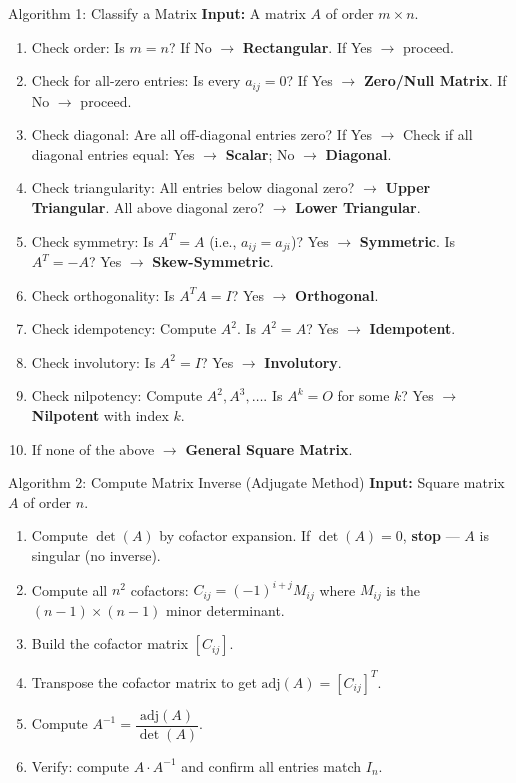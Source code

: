 \documentclass[12pt,a4paper]{article}
\begin{document}
\begin{learnbox}{Algorithm 1: Classify a Matrix}
\textbf{Input:} A matrix $A$ of order $m \times n$.
\begin{enumerate}
  \item Check order: Is $m = n$? If No $\to$ \textbf{Rectangular}. If Yes $\to$ proceed.
  \item Check for all-zero entries: Is every $a_{ij} = 0$? If Yes $\to$ \textbf{Zero/Null Matrix}. If No $\to$ proceed.
  \item Check diagonal: Are all off-diagonal entries zero? If Yes $\to$ Check if all diagonal entries equal: Yes $\to$ \textbf{Scalar}; No $\to$ \textbf{Diagonal}.
  \item Check triangularity: All entries below diagonal zero? $\to$ \textbf{Upper Triangular}. All above diagonal zero? $\to$ \textbf{Lower Triangular}.
  \item Check symmetry: Is $A^T = A$ (i.e., $a_{ij} = a_{ji}$)? Yes $\to$ \textbf{Symmetric}. Is $A^T = -A$? Yes $\to$ \textbf{Skew-Symmetric}.
  \item Check orthogonality: Is $A^T A = I$? Yes $\to$ \textbf{Orthogonal}.
  \item Check idempotency: Compute $A^2$. Is $A^2 = A$? Yes $\to$ \textbf{Idempotent}.
  \item Check involutory: Is $A^2 = I$? Yes $\to$ \textbf{Involutory}.
  \item Check nilpotency: Compute $A^2, A^3, \ldots$. Is $A^k = O$ for some $k$? Yes $\to$ \textbf{Nilpotent} with index $k$.
  \item If none of the above $\to$ \textbf{General Square Matrix}.
\end{enumerate}
\end{learnbox}

\begin{learnbox}{Algorithm 2: Compute Matrix Inverse (Adjugate Method)}
\textbf{Input:} Square matrix $A$ of order $n$.
\begin{enumerate}
  \item Compute $\det(A)$ by cofactor expansion. If $\det(A) = 0$, \textbf{stop} --- $A$ is singular (no inverse).
  \item Compute all $n^2$ cofactors: $C_{ij} = (-1)^{i+j} M_{ij}$ where $M_{ij}$ is the $(n-1)\times(n-1)$ minor determinant.
  \item Build the cofactor matrix $[C_{ij}]$.
  \item Transpose the cofactor matrix to get $\text{adj}(A) = [C_{ij}]^T$.
  \item Compute $A^{-1} = \dfrac{\text{adj}(A)}{\det(A)}$.
  \item Verify: compute $A \cdot A^{-1}$ and confirm all entries match $I_n$.
\end{enumerate}
\end{learnbox}
\end{document}
